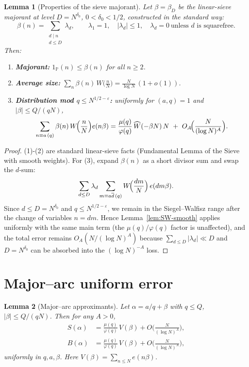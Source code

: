 \documentclass[11pt]{article}
\newtheorem{lemma}{Lemma}[part]
\theoremstyle{definition}
\theoremstyle{remark}
\numberwithin{equation}{part}
\begin{document}
\begin{lemma}[Properties of the sieve majorant]\label{lem:beta-properties}
	Let $\beta=\beta_{D}$ be the linear-sieve majorant at level $D=N^{\delta_0}$, $0<\delta_0<1/2$, constructed in the standard way:
	\[
		\beta(n)=\sum_{\substack{d\mid n\\ d\le D}}\lambda_d,\qquad
		\lambda_1=1,\quad |\lambda_d|\le 1,\quad \lambda_d=0\ \text{unless $d$ is squarefree}.
	\]
	Then:
	\begin{enumerate}[leftmargin=2em]
		\item \textbf{Majorant: } $1_{\mathbb P}(n)\le \beta(n)$ for all $n\ge2$.
		\item \textbf{Average size: } $\displaystyle \sum_{n}\beta(n)\,W\!\Big(\frac{n}{N}\Big)=\frac{N}{\log N}\,(1+o(1))$.
		\item \textbf{Distribution mod $q\le N^{1/2-\varepsilon}$: } uniformly for $(a,q)=1$ and $|\beta|\le Q/(qN)$,
		      \[
			      \sum_{n\equiv a\,(q)}\beta(n)\,W\!\Bigl(\frac{n}{N}\Bigr)e(n\beta)
			      = \frac{\mu(q)}{\varphi(q)}\,\widehat W(-\beta N)\,N\ +\ O_A\!\Bigl(\frac{N}{(\log N)^{A}}\Bigr).
		      \]
	\end{enumerate}
\end{lemma}

\begin{proof}
	(1)-(2) are standard linear-sieve facts (Fundamental Lemma of the Sieve with smooth weights).
	For (3), expand $\beta(n)$ as a short divisor sum and swap the $d$-sum:
	\[
		\sum_{d\le D}\lambda_d\sum_{m\equiv a\overline d\,(q)} W\!\Bigl(\frac{dm}{N}\Bigr)\,e(dm\beta).
	\]
	Since $d\le D=N^{\delta_0}$ and $q\le N^{1/2-\varepsilon}$, we remain in the Siegel--Walfisz range after the change of variables $n=dm$.
	Hence Lemma~\ref{lem:SW-smooth} applies uniformly with the same main term (the $\mu(q)/\varphi(q)$ factor is unaffected), and the total error remains $O_A(N/(\log N)^A)$ because $\sum_{d\le D}|\lambda_d|\ll D$ and $D=N^{\delta_0}$ can be absorbed into the $(\log N)^{-A}$ loss.
\end{proof}

\section{Major--arc uniform error}

\begin{lemma}[Major--arc approximants]\label{lem:major-errors}
	Let $\alpha=a/q+\beta$ with $q\le Q$, $|\beta|\le Q/(qN)$. Then for any $A>0$,
	\begin{align*}
		S(\alpha) & =\frac{\mu(q)}{\varphi(q)}\,V(\beta)+O\!\Big(\frac{N}{(\log N)^A}\Big), \\
		B(\alpha) & =\frac{\mu(q)}{\varphi(q)}\,V(\beta)+O\!\Big(\frac{N}{(\log N)^A}\Big),
	\end{align*}
	uniformly in $q,a,\beta$. Here $V(\beta)=\sum_{n\le N}e(n\beta)$.
\end{lemma}
\end{document}
